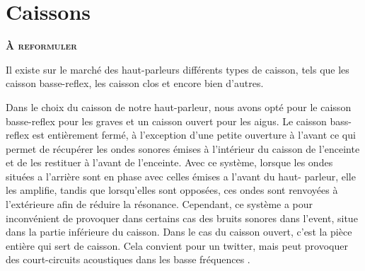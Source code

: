 \section{Caissons}

\textbf{\textsc{À reformuler}}

Il existe sur le marché des haut-parleurs
différents types de caisson, tels que
les caisson basse-reflex, les caisson clos et encore bien d’autres.

Dans le choix du caisson de notre haut-parleur,
nous avons opté pour le caisson basse-reflex pour les graves
et un caisson ouvert pour les aigus.
Le caisson bass-reflex est entièrement fermé, à l'exception d'une petite ouverture à l'avant ce qui permet de récupérer les ondes sonores émises à l'intérieur du caisson de l'enceinte et de les restituer à l'avant de l'enceinte.
Avec ce système, lorsque les ondes situées a l’arrière sont en phase
avec celles émises a l’avant du haut- parleur, elle les amplifie,
tandis que lorsqu’elles  sont opposées,
ces ondes sont renvoyées à l’extérieure afin de réduire la résonance\cite{US6275597}.
Cependant, ce système a pour inconvénient de provoquer dans certains cas
des bruits sonores dans l’event, situe dans la partie inférieure du caisson.
Dans le cas du caisson ouvert, c'est la pièce entière qui sert de caisson. Cela convient pour un twitter, mais peut provoquer des court-circuits acoustiques dans les basse fréquences \cite{petoin}.